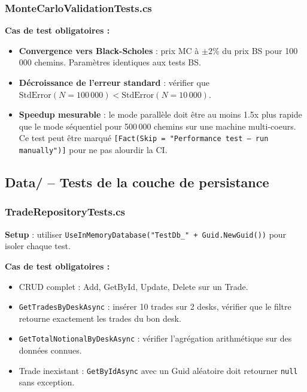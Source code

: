 \documentclass[a4paper,11pt]{article}
\newcommand{\cs}[1]{\texttt{\color{codeinline}#1}}
\begin{document}
\subsubsection{MonteCarloValidationTests.cs}

\textbf{Cas de test obligatoires :}
\begin{itemize}
  \item \textbf{Convergence vers Black-Scholes} : prix MC à $\pm 2\%$ du
        prix BS pour 100\,000 chemins. Paramètres identiques aux tests BS.
  \item \textbf{Décroissance de l'erreur standard} : vérifier que
        $\text{StdError}(N=100\,000) < \text{StdError}(N=10\,000)$.
  \item \textbf{Speedup mesurable} : le mode parallèle doit être au moins
        1.5x plus rapide que le mode séquentiel pour 500\,000 chemins sur une
        machine multi-coeurs. Ce test peut être marqué
        \cs{[Fact(Skip = "Performance test -- run manually")]} pour ne pas
        alourdir la CI.
\end{itemize}

\subsection{Data/ -- Tests de la couche de persistance}

\subsubsection{TradeRepositoryTests.cs}

\textbf{Setup} : utiliser \cs{UseInMemoryDatabase("TestDb\_" + Guid.NewGuid())}
pour isoler chaque test.

\textbf{Cas de test obligatoires :}
\begin{itemize}
  \item CRUD complet : Add, GetById, Update, Delete sur un Trade.
  \item \cs{GetTradesByDeskAsync} : insérer 10 trades sur 2 desks, vérifier
        que le filtre retourne exactement les trades du bon desk.
  \item \cs{GetTotalNotionalByDeskAsync} : vérifier l'agrégation
        arithmétique sur des données connues.
  \item Trade inexistant : \cs{GetByIdAsync} avec un Guid aléatoire doit
        retourner \cs{null} sans exception.
\end{itemize}
\end{document}
